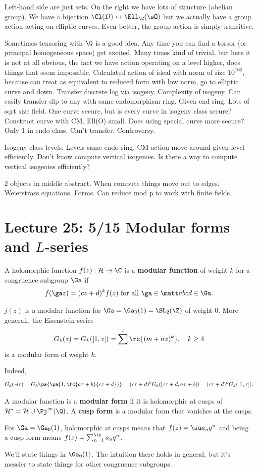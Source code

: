 Left-hand side are just sets. On the right we have lots of structure
(abelian group). We have a bijection $\Cl(D)\leftrightarrow\Ell_{\C}(\sO)$
but we actually have a group action acting on elliptic curves. Even
better, the group action is simply transitive.

Sometimes tensoring with $\Q$ is a good idea. Any time you can find
a torsor (or principal homogeneous space) get excited. Many times
kind of trivial, but here it is not at all obvious, the fact we have
action operating on a level higher, does things that seem impossible.
Calculated action of ideal with norm of size $10^{100}$, because
can treat as equivalent to reduced form with low norm, go to elliptic
curve and down. Transfer discrete log via isogeny. Complexity of isogeny.
Can easily transfer dlp to any with same endomorphism ring. Given
end ring. Lots of sqrt size field. One curve secure, but is every
curve in isogeny class secure? Construct curve with CM. Ell(O) small.
Does using special curve more secure? Only 1 in endo class. Can't
transfer. Controversy.

Isogeny class levels. Levels same endo ring. CM action move around
given level efficiently. Don't know compute vertical isogenies. Is
there a way to compute vertical isogenies efficiently?

2 objects in middle abstract. When compute things move out to edges.
Weierstrass equations. Forms. Can reduce mod p to work with finite
fields.
\section{Lecture 25: 5/15 Modular forms and $L$-series}
\begin{df}
A holomorphic function $f(z):\cal H\to \C$ is a \textbf{modular function} of weight $k$ for a congruence subgroup $\Ga$ if
\[
f(\ga z)=(cz+d)^k f(z)\text{ for all }\ga\in \matt abcd\in \Ga.
\]
\end{df}
\begin{ex}
$j(z)$ is a modular function for $\Ga=\Ga_0(1)=\SL_2(\Z)$ of weight 0. More generall, the Eisenstein series %
\[
G_k(z)=G_k([1,z])=\sum'\rc{(m+nz)^k},\quad k\ge 4
\] is a modular form of weight $k$.

Indeed,
\[
G_k(A\tau)=G_k\pa{\pa{1,\fc{a\tau+b}{c\tau+d}}}=
(c\tau+d)^kG_k([c\tau+d,a\tau+b])=(c\tau+d)^kG_k([1,\tau]).
\]
\end{ex}
\begin{df}
A modular function is a \textbf{modular form} if it is holomorphic at cusps of $\cal H^*=\cal H\cup \Pj^1(\Q)$. A \textbf{cusp form} is a modular form that vanishes at the cusps.

For $\Ga=\Ga_0(1)$, holomorphic at cusps means that $f(z)=\su a_nq^n$ and being a cusp form means $f(z)=\sum_{n=1}^{\iy} a_nq^n$.
\end{df}
We'll state things in $\Ga_0(1)$. The intuition there holds in general, but it's messier to state things for other congruence subgroups.

